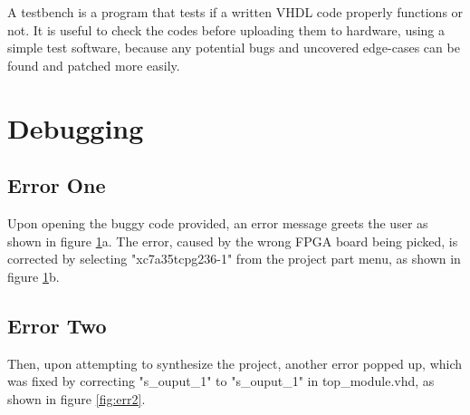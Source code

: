 \documentclass[a4paper, 12pt]{article}
\begin{document}
A testbench is a program that tests if a written VHDL code properly functions or not.
It is useful to check the codes before uploading them to hardware, using a simple test software, because any potential bugs and uncovered edge-cases can be found and patched more easily.

\section{Debugging}
\subsection{Error One}
Upon opening the buggy code provided, an error message greets the user as shown in figure \ref{fig:err1}a.
The error, caused by the wrong FPGA board being picked, is corrected by selecting "xc7a35tcpg236-1" from the project part menu, as shown in figure \ref{fig:err1}b.

\begin{figure}[!h]
	\centering
	\hfill
	\caption{}
	\label{fig:err1}
\end{figure}


\subsection{Error Two}

Then, upon attempting to synthesize the project, another error popped up, which was fixed by correcting "s\_ouput\_1" to "s\_ouput\_1" in top\_module.vhd, as shown in figure \ref{fig:err2}.
\end{document}
